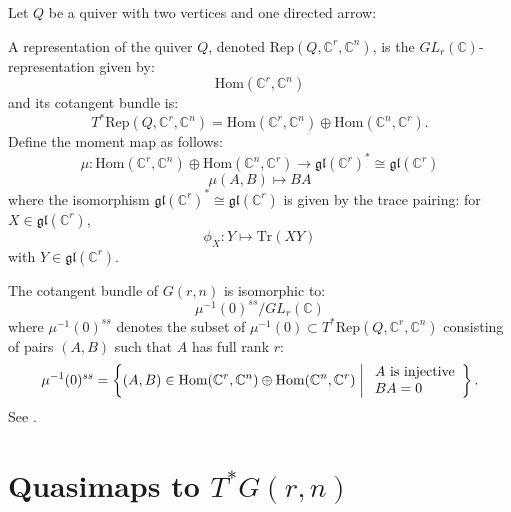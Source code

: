 \documentclass{amsart}
\begin{document}
Let $Q$ be a quiver with two vertices and one directed arrow:
\vspace{0.5em}
\begin{center}
\end{center}
\vspace{0.5em}
A representation of the quiver $Q$, denoted $\mathrm{Rep}(Q,\mathbb{C}^r,\mathbb{C}^n)$, is the $GL_r(\mathbb{C})$-representation given by:
\[
\mathrm{Hom}(\mathbb{C}^r,\mathbb{C}^n)
\]
and its cotangent bundle is:
\[
T^*\mathrm{Rep}(Q,\mathbb{C}^r,\mathbb{C}^n) = \mathrm{Hom}(\mathbb{C}^r,\mathbb{C}^n) \oplus \mathrm{Hom}(\mathbb{C}^n,\mathbb{C}^r).
\]
 Define the moment map as follows:
 \[
 \mu: \mathrm{Hom}(\mathbb{C}^r, \mathbb{C}^n) \oplus \mathrm{Hom}(\mathbb{C}^n,\mathbb{C}^r) \to \mathfrak{gl}(\mathbb{C}^r)^* \cong \mathfrak{gl}(\mathbb{C}^r)
 \]
 \[
 \mu(A,B) \mapsto BA
 \]
  where the isomorphism $\mathfrak{gl}(\mathbb{C}^r)^* \cong \mathfrak{gl}(\mathbb{C}^r)$ is given by the trace pairing: for  $X \in \mathfrak{gl}(\mathbb{C}^r)$,
  \[
  \phi_X: Y \mapsto \mathrm{Tr}(XY)
  \]
  with $Y \in \mathfrak{gl}(\mathbb{C}^r)$.
  
  The cotangent bundle of $G(r,n)$ is isomorphic to: 
\[
\mu^{-1}(0)^{ss}/GL_r(\mathbb{C})
\]
where $\mu^{-1}(0)^{ss}$ denotes the subset of $\mu^{-1}(0) \subset T^*\mathrm{Rep}(Q,\mathbb{C}^r,\mathbb{C}^n)$ consisting of pairs $(A,B)$ such that $A$ has full rank $r$:
\[
\mu^{-1}(0)^{ss} = \left\{
(A,B) \in \mathrm{Hom}(\mathbb{C}^r,\mathbb{C}^n) \oplus \mathrm{Hom}(\mathbb{C}^n,\mathbb{C}^r)
 \biggm| \begin{array}{l}
A \textrm{ is injective}\\
 \textrm{$BA=0$}
\end{array}
\right\}.
\]
See \cite[Example 10]{MR3644099}.
\section{Quasimaps to \texorpdfstring{$T^*G(r,n)$}{T*Gr(r,n)}}\label{section 7}
\end{document}
